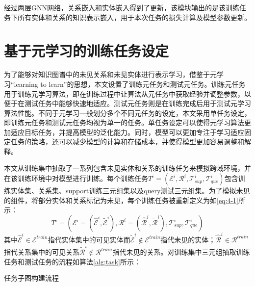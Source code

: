 经过两层GNN网络，关系嵌入和实体嵌入得到了更新，该模块输出的是该训练任务下所有实体和关系的知识表示嵌入，用于本次任务的损失计算及模型参数更新。

\section{基于元学习的训练任务设定}
为了能够对知识图谱中的未见关系和未见实体进行表示学习，借鉴于元学习“learning to learn”的思想，本文设置了训练元任务和测试元任务。训练元任务用于训练元学习算法，即在训练过程中让算法从元任务中获取经验并调整参数，以便于在测试任务中能够快速地适应。测试元任务则是在训练完成后用于测试元学习算法性能。不同于元学习一般划分多个不同元任务的设定，本文采用单任务设定，即训练元任务和测试元任务均视为单一的任务。单任务设定可以使得元学习算法更加适应目标任务，并提高模型的泛化能力。同时，模型可以更加专注于学习适应固定任务的策略，还可以减少模型的计算和存储成本，并使得模型更加容易调整和解释。

本文从训练集中抽取了一系列包含未见实体和关系的训练任务来模拟跨域环境，并在该训练环境中对模型进行训练。每个训练任务\(T^{i} = (\mathcal{E}^{i}, \mathcal{R}^{i}, \mathcal{T}^{i}_{sup},\mathcal{T}^{i}_{que})\)包含训练实体集、关系集、support训练三元组集以及query测试三元组集。为了模拟未见的组件，将部分实体和关系标记为未见，每个训练任务被重新定义为如\ref{eq:4-1}所示：
\begin{equation}
  T^{i} = (\mathcal{E}^{i} = (\hat{\mathcal{E}}^{i},\tilde{\mathcal{E}}^{i}), \mathcal{R}^{i} = (\hat{\mathcal{R}}^{i} ,\tilde{\mathcal{R}}^{i}   ), \mathcal{T}^{i}_{sup},\mathcal{T}^{i}_{que})  \label{eq:4-1}
\end{equation}
其中\(\hat{\mathcal{E}}^{i} \in \mathcal{E}^{train}\)指代实体集中的可见实体而\(\tilde{\mathcal{E}}^{i} \notin \mathcal{E}^{train}\)指代未见的实体；\(\hat{\mathcal{R}}^{i} \in \mathcal{R}^{train}\)指代关系集中的可见关系\(\tilde{\mathcal{R}}^{i} \notin \mathcal{R}^{train}\)指代未见的关系。对训练集中三元组抽取训练任务和测试任务的流程如算法\ref{alg:task}所示：
\begin{algorithm}
  \caption{任务子图构建流程}\label{alg:task}
\end{algorithm}

